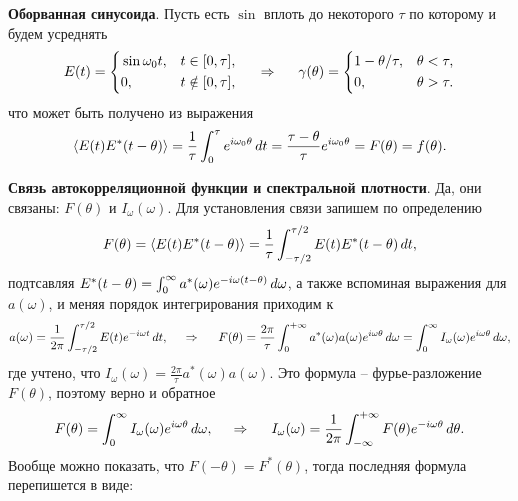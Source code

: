 \textbf{Оборванная синусоида}. Пусть есть $\sin$ вплоть до некоторого $\tau$ по которому и будем усреднять
\begin{equation*}
    E(t) = \left\{\begin{aligned}
        &\sin \omega_0 t, &t \in[0, \tau], \\
        &0,     &t \notin [0, \tau],
    \end{aligned}\right.
    \hspace{0.5cm} \Rightarrow \hspace{0.5cm}
    \gamma(\theta) = \left\{\begin{aligned}
        &1-\theta/\tau, &\theta < \tau, \\
        &0, &\theta > \tau.
    \end{aligned}\right.
\end{equation*}
что может быть получено из выражения
\begin{equation*}
    \left\langle E(t) E^* (t-\theta)\right\rangle = \frac{1}{\tau} \int_0^\tau e^{i \omega_0 \theta} \, d t = \frac{\tau-\theta}{\tau} e^{i \omega_0 \theta} = F(\theta) = f(\theta).
\end{equation*}

\textbf{Связь автокорреляционной функции и спектральной плотности}. Да, они связаны: $F(\theta)$ и $I_\omega(\omega)$. Для установления связи запишем по определению
\begin{equation*}
    F(\theta) = \left\langle E(t) E^* (t-\theta)\right\rangle = \frac{1}{\tau} \int_{-\tau/2}^{\tau/2} E(t) E^* (t-\theta) \, d t,
\end{equation*}
подтсавляя $E^*(t-\theta) = \int_0^\infty a^* (\omega) e^{-i \omega (t-\theta)} \, d \omega$, а также вспоминая выражения для $a(\omega)$, и меняя порядок интегрирования приходим к
\begin{equation*}
    a(\omega) = \frac{1}{2\pi} \int_{-\tau/2}^{\tau/2} E(t) e^{-i \omega t} \, d t,
    \hspace{0.5cm} \Rightarrow \hspace{0.5cm}
    F(\theta) = \frac{2\pi}{\tau} \int_{0}^{+\infty}  a^*(\omega) a(\omega) e^{i \omega \theta} \, d \omega = 
    \int_{0}^{\infty} I_\omega (\omega) e^{i \omega \theta} \, d \omega,
\end{equation*}
где учтено, что $I_\omega (\omega) = \frac{2\pi}{\tau} a^*(\omega) a(\omega)$. Это формула -- фурье-разложение $F(\theta)$, поэтому верно и обратное
\begin{equation*}
    F(\theta) = \int_{0}^{\infty} I_\omega (\omega) e^{i \omega \theta} \, d \omega,
    \hspace{0.5cm} \Rightarrow \hspace{0.5cm}
    I_\omega (\omega) = \frac{1}{2\pi} \int_{-\infty}^{+\infty} F(\theta) e^{-i \omega \theta} \, d \theta.
\end{equation*}
Вообще можно показать, что $F(-\theta) = F^*(\theta)$, тогда последняя формула перепишется в виде:

